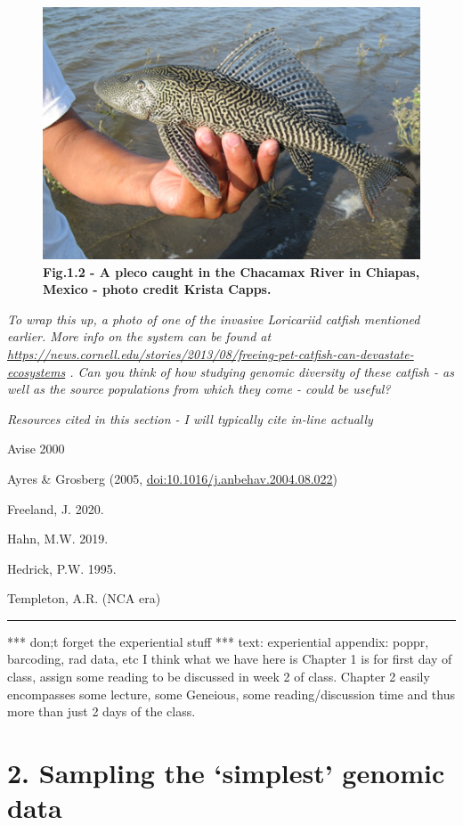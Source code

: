 \documentclass[
]{article}
\begin{document}
\begin{figure}
\centering
\includegraphics{MEImages/Pleco8-21.jpg}
\caption{\textbf{Fig.1.2 - A pleco caught in the Chacamax River in
Chiapas, Mexico - photo credit Krista Capps.}}
\end{figure}

\emph{To wrap this up, a photo of one of the invasive Loricariid catfish
mentioned earlier. More info on the system can be found at
\url{https://news.cornell.edu/stories/2013/08/freeing-pet-catfish-can-devastate-ecosystems}
. Can you think of how studying genomic diversity of these catfish - as
well as the source populations from which they come - could be useful?}

\emph{Resources cited in this section - I will typically cite in-line
actually}

Avise 2000

Ayres \& Grosberg (2005, \url{doi:10.1016/j.anbehav.2004.08.022})

Freeland, J. 2020.

Hahn, M.W. 2019.

Hedrick, P.W. 1995.

Templeton, A.R. (NCA era)

\begin{center}\rule{0.5\linewidth}{0.5pt}\end{center}

*** don;t forget the experiential stuff *** text: experiential appendix:
poppr, barcoding, rad data, etc I think what we have here is Chapter 1
is for first day of class, assign some reading to be discussed in week 2
of class. Chapter 2 easily encompasses some lecture, some Geneious, some
reading/discussion time and thus more than just 2 days of the class.

\hypertarget{sampling-the-simplest-genomic-data}{%
\section{2. Sampling the `simplest' genomic
data}\label{sampling-the-simplest-genomic-data}}
\end{document}
